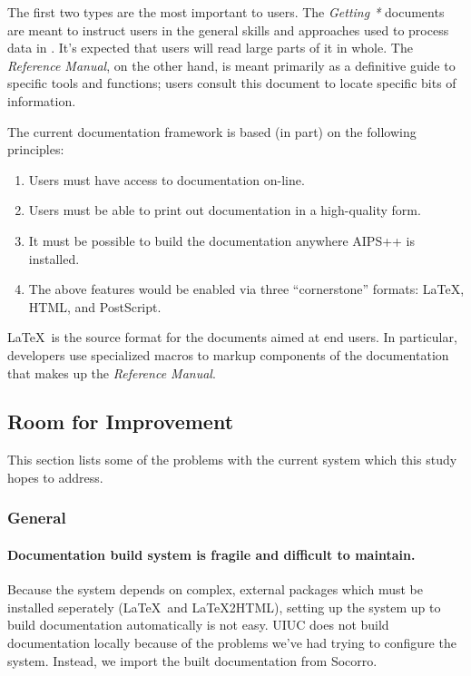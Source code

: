 \noindent The first two types are the most important to users.  The
{\it Getting *} documents are meant to instruct users
in the general skills and approaches used to process data in
\aipspp.  It's expected that users will read large parts of it in
whole.  The {\it Reference Manual}, on the other hand, is meant
primarily as a definitive guide to specific tools and functions; users
consult this document to locate specific bits of information.  

The current documentation framework is based (in part) on the
following principles:

\begin{enumerate}
\item Users must have access to documentation on-line.
\item Users must be able to print out documentation in a high-quality
form.
\item It must be possible to build the documentation anywhere AIPS++
is installed.
\item The above features would be enabled via three ``cornerstone''
formats: \LaTeX, HTML, and PostScript.  
\end{enumerate}

\noindent \LaTeX\ is the source format for the documents aimed at
end users.  In particular, developers use specialized macros to
markup components of the documentation that makes up the {\it
Reference Manual}.  

\subsection{Room for Improvement}

This section lists some of the problems with the current system which
this study hopes to address.

\subsubsection{General}

\paragraph{Documentation build system is fragile and difficult to
maintain.}  Because the system depends on complex, external packages
which must be installed seperately (\LaTeX\ and \LaTeX2HTML), setting
up the system up to build documentation automatically is not easy.
UIUC does not build documentation locally because of the problems
we've had trying to configure the system.  Instead, we import the
built documentation from Socorro.  

